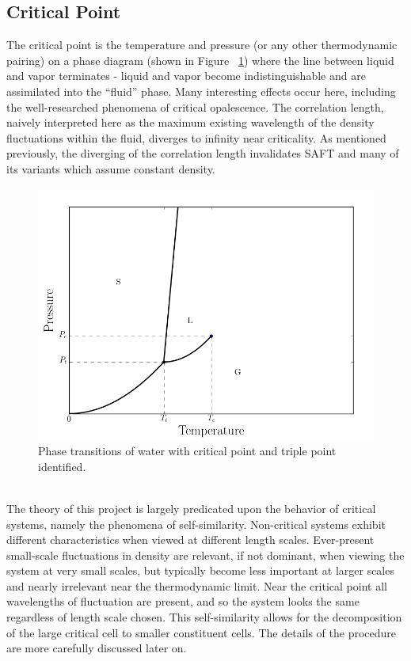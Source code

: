 \documentclass[12pt]{article}
\begin{document}
\subsection{Critical Point} 
The critical point is the temperature and pressure (or any other thermodynamic pairing) on a phase diagram (shown in Figure ~\ref{phase}) where the line between liquid and vapor terminates - liquid and vapor become indistinguishable and are assimilated into the ``fluid'' phase. Many interesting effects occur here, including the well-researched phenomena of critical opalescence. The correlation length, naively interpreted here as the maximum existing wavelength of the density fluctuations within the fluid, diverges to infinity near criticality. As mentioned previously, the diverging of the correlation length invalidates SAFT and many of its variants which assume constant density. 
\begin{figure}
    \centering
    \includegraphics[width=.75\textwidth]{phase.png}
    \caption{Phase transitions of water with critical point and triple point identified.}
    \label{phase}
\end{figure}
\\
The theory of this project is largely predicated upon the behavior of critical systems, namely the phenomena of self-similarity. Non-critical systems exhibit different characteristics when viewed at different length scales. Ever-present small-scale fluctuations in density are relevant, if not dominant, when viewing the system at very small scales, but typically become less important at larger scales and nearly irrelevant near the thermodynamic limit. Near the critical point all wavelengths of fluctuation are present, and so the system looks the same regardless of length scale chosen. This self-similarity allows for the decomposition of the large critical cell to smaller constituent cells. The details of the procedure are more carefully discussed later on.   
\end{document}
